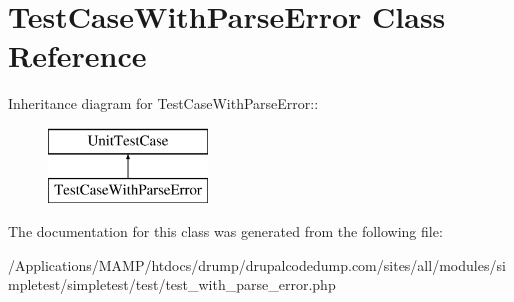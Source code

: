 \hypertarget{class_test_case_with_parse_error}{
\section{TestCaseWithParseError Class Reference}
\label{class_test_case_with_parse_error}
}
Inheritance diagram for TestCaseWithParseError::\begin{figure}[H]
\begin{center}
\leavevmode
\includegraphics[height=2cm]{class_test_case_with_parse_error}
\end{center}
\end{figure}


The documentation for this class was generated from the following file:\begin{DoxyCompactItemize}
\item 
/Applications/MAMP/htdocs/drump/drupalcodedump.com/sites/all/modules/simpletest/simpletest/test/test\_\-with\_\-parse\_\-error.php\end{DoxyCompactItemize}
